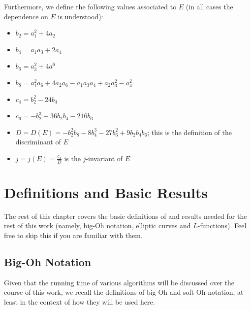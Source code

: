 Furthermore, we define the following values associated to $E$ (in all cases the dependence on $E$ is understood):
\begin{itemize}
\item $b_2 = a_1^2 + 4a_2$
\item $b_4 = a_1 a_3 + 2a_4$
\item $b_6 = a_3^2 + 4a^6$
\item $b_8 = a_1^2 a_6 + 4 a_2 a_6 - a_1 a_3 a_4 + a_2 a_3^2 - a_4^2$
\item $c_4 = b_2^2 - 24 b_4$
\item $c_6 = -b_2^3 + 36 b_2 b_4  - 216 b_6$
\item $D = D(E) = -b_2^2 b_8 - 8 b_4^3 - 27 b_6^2 + 9 b_2 b_4 b_6$; this is the definition of the discriminant of $E$
\item $j = j(E) = \frac{c_4}{D}$ is the $j$-invariant of $E$
\end{itemize}

\newpage
\section{Definitions and Basic Results}

The rest of this chapter covers the basic definitions of and results needed for the rest of this work (namely, big-Oh notation, elliptic curves and $L$-functions). Feel free to skip this if you are familiar with them.

\subsection{Big-Oh Notation}

Given that the running time of various algorithms will be discussed over the course of this work, we recall the definitions of big-Oh and soft-Oh notation, at least in the context of how they will be used here.

